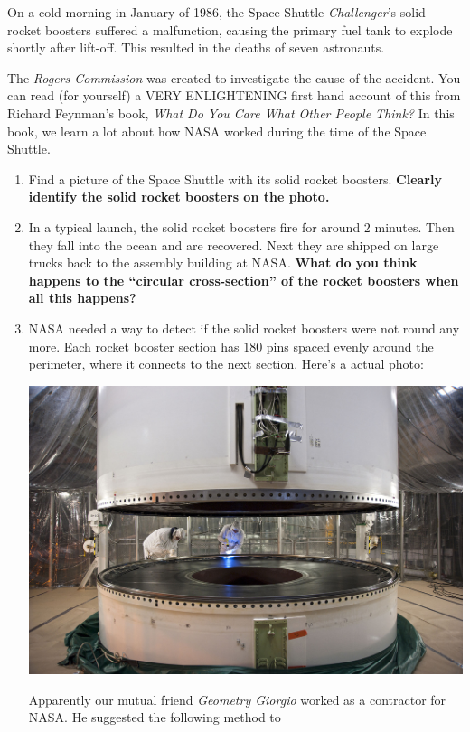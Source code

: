 \documentclass[nooutcomes,noauthor,hints,handout]{ximera}
\begin{document}
\begin{question}
  On a cold morning in January of 1986, the Space Shuttle
  \textit{Challenger}'s solid rocket boosters suffered a malfunction,
  causing the primary fuel tank to explode shortly after lift-off.
  This resulted in the deaths of seven astronauts. 


  The \textit{Rogers Commission} was created to investigate the cause
  of the accident.  You can read (for yourself) a VERY ENLIGHTENING
  first hand account of this from Richard Feynman's book, \textit{What
    Do You Care What Other People Think?} In this book, we learn a lot
  about how NASA worked during the time of the Space Shuttle.

  \begin{enumerate}
  \item Find a picture of the Space Shuttle with its solid rocket
    boosters. \textbf{Clearly identify the solid rocket boosters on the photo.}
  \item In a typical launch, the solid rocket boosters fire for around
    $2$ minutes. Then they fall into the ocean and are recovered. Next
    they are shipped on large trucks back to the assembly
    building at NASA. \textbf{What do you think happens to the ``circular
    cross-section'' of the rocket boosters when all this happens?}
  \item NASA needed a way to detect if the solid rocket boosters were
    not round any more. Each rocket booster section has $180$ pins
    spaced evenly around the perimeter, where it connects to the next
    section. Here's a actual photo:
    \begin{center}%
      \includegraphics[width=.6\textwidth]{srbSections.jpg}
    \end{center}
    Apparently our mutual friend \textit{Geometry Giorgio} worked as a
    contractor for NASA. He suggested the following method to

\end{enumerate}
\end{question}
\end{document}
